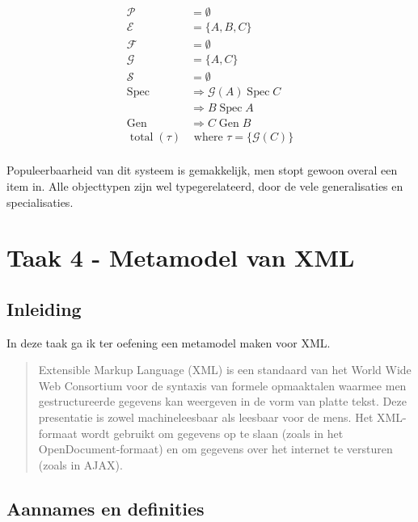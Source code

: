 \documentclass[11pt]{article}
\newcommand{\Spec}{\ensuremath{\operatorname{Spec}}}
\newcommand{\Gen}{\ensuremath{\operatorname{Gen}}}
\newcommand{\total}{\ensuremath{\operatorname{total}}}
\begin{document}
\begin{align*}
  \mathcal{P}   & = \emptyset                               \\
  \mathcal{E}   & = \{A, B, C\}                             \\
  \mathcal{F}   & = \emptyset                               \\
  \mathcal{G}   & = \{A, C\}                                \\
  \mathcal{S}   & = \emptyset                               \\
  \Spec         & \Rightarrow \mathcal{G} (A) \Spec C       \\
                & \Rightarrow B \Spec A                     \\
  \Gen          & \Rightarrow C \Gen B                      \\
  \total (\tau) & \text{ where } \tau = \{\mathcal{G} (C)\} \\
\end{align*}

Populeerbaarheid van dit systeem is gemakkelijk, men stopt gewoon overal een
item in. Alle objecttypen zijn wel typegerelateerd, door de vele generalisaties
en specialisaties.


\section{Taak 4 - Metamodel van XML}

\subsection{Inleiding}

In deze taak ga ik ter oefening een metamodel maken voor XML. 

\begin{quote}

Extensible Markup Language (XML) is een standaard van het World Wide Web
Consortium voor de syntaxis van formele opmaaktalen waarmee men gestructureerde
gegevens kan weergeven in de vorm van platte tekst. Deze presentatie is zowel
machineleesbaar als leesbaar voor de mens. Het XML-formaat wordt gebruikt om
gegevens op te slaan (zoals in het OpenDocument-formaat) en om gegevens over
het internet te versturen (zoals in AJAX).\cite{xmlwikipedia}
\end{quote}

\subsection{Aannames en definities}
\end{document}
